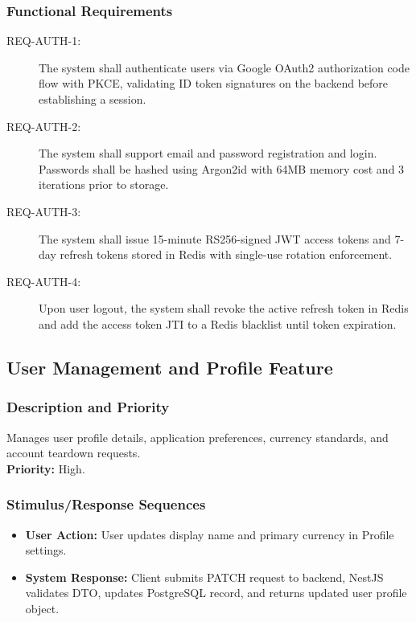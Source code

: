 \documentclass[11pt,a4paper]{article}
\begin{document}
\subsubsection{Functional Requirements}
\begin{description}
    \item[REQ-AUTH-1:] The system shall authenticate users via Google OAuth2 authorization code flow with PKCE, validating ID token signatures on the backend before establishing a session.
    \item[REQ-AUTH-2:] The system shall support email and password registration and login. Passwords shall be hashed using Argon2id with 64MB memory cost and 3 iterations prior to storage.
    \item[REQ-AUTH-3:] The system shall issue 15-minute RS256-signed JWT access tokens and 7-day refresh tokens stored in Redis with single-use rotation enforcement.
    \item[REQ-AUTH-4:] Upon user logout, the system shall revoke the active refresh token in Redis and add the access token JTI to a Redis blacklist until token expiration.
\end{description}

\subsection{User Management and Profile Feature}
\subsubsection{Description and Priority}
Manages user profile details, application preferences, currency standards, and account teardown requests. \\
\textbf{Priority:} High.

\subsubsection{Stimulus/Response Sequences}
\begin{itemize}
    \item \textbf{User Action:} User updates display name and primary currency in Profile settings.
    \item \textbf{System Response:} Client submits PATCH request to backend, NestJS validates DTO, updates PostgreSQL record, and returns updated user profile object.
\end{itemize}
\end{document}
